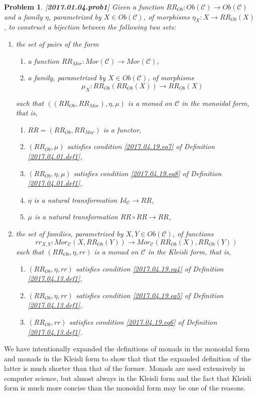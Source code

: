 \documentclass[12pt]{amsart}
\newtheorem{problem}[proposition]{Problem}
\newcommand{\llabel}[1]{\label{#1}[{\bf #1}]}
\newcommand{\sr}{\rightarrow}
\newcommand{\C}{{\mathcal C}}
\begin{document}
\begin{problem}
\llabel{2017.01.04.prob1}
Given a function $RR_{Ob}:Ob(\C)\sr Ob(\C)$ and a family $\eta$, parametrized by $X\in Ob(\C)$, of morphisms $\eta_X:X\sr RR_{Ob}(X)$, to construct a bijection between the following two sets:
%
\begin{enumerate}
\item the set of pairs of the form
%
\begin{enumerate}
\item a function $RR_{Mor}:Mor(\C)\sr Mor(\C)$,
\item a family, parametrized by $X\in Ob(\C)$, of morphisms 
%
$$\mu_X:RR_{Ob}(RR_{Ob}(X))\sr RR_{Ob}(X)$$
%
\end{enumerate}
%
such that $((RR_{Ob},RR_{Mor}),\eta,\mu)$ is a monad on $\C$ in the monoidal form, that is, 
%
\begin{enumerate}[resume]
\item $RR=(RR_{Ob},RR_{Mor})$ is a functor,
\item $(RR_{Ob},\mu)$ satisfies condition \ref{2017.04.19.eq7} of Definition \ref{2017.04.01.def1},
\item $(RR_{Ob},\eta,\mu)$ satisfies condition \ref{2017.04.19.eq8} of Definition \ref{2017.04.01.def1},
\item $\eta$ is a natural transformation $Id_{\C}\sr RR$,
\item $\mu$ is a natural transformation $RR\circ RR\sr RR$,
\end{enumerate}
%
\item the set of families, parametrized by $X,Y\in Ob(\C)$, of functions
%
$$rr_{X,Y}:Mor_{\C}(X,RR_{Ob}(Y))\sr Mor_{\C}(RR_{Ob}(X),RR_{Ob}(Y))$$
%
such that $(RR_{Ob},\eta,rr)$ is a monad on $\C$ in the Kleisli form, that is, 
%
\begin{enumerate}
\item $(RR_{Ob},\eta,rr)$ satisfies condition \ref{2017.04.19.eq4} of Definition \ref{2017.04.13.def1},
\item $(RR_{Ob},\eta,rr)$ satisfies condition \ref{2017.04.19.eq5} of Definition \ref{2017.04.13.def1},
\item $(RR_{Ob},rr)$ satisfies condition \ref{2017.04.19.eq6} of Definition \ref{2017.04.13.def1}.
\end{enumerate}
\end{enumerate}
\end{problem}
%
We have intentionally expanded the definitions of monads in the monoidal form and monads in the Kleisli form to show that that the expanded definition of the latter is much shorter than that of the former. Monads are used extensively in computer science, but almost always in the Kleisli form and the fact that Kleisli form is much more concise than the monoidal form may be one of the reasons. 
\end{document}
